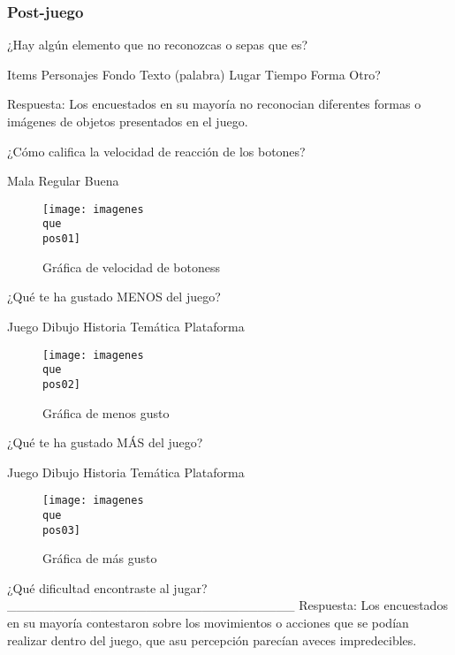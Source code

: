 \subsubsection{Post-juego}
\begin{questions}
	
	{%
	\checkboxchar{$\Box$} %
	\question ¿Hay algún elemento que no reconozcas  o sepas que es?
	\begin{checkboxes}
		\choice Items
		\choice Personajes
		\choice Fondo
		\choice Texto (palabra)
		\choice Lugar
		\choice Tiempo
		\choice Forma
		\choice Otro?
	\end{checkboxes}
}%

Respuesta: Los encuestados en su mayoría no reconocian diferentes formas o imágenes de objetos presentados en el juego.	

	\question ¿Cómo califica la velocidad de reacción de los botones?
	\begin{checkboxes}
		\choice Mala
		\choice Regular
		\choice Buena
	\end{checkboxes}

\begin{figure}
	\centering
	\caption{Gráfica de velocidad de botoness}
	\label{fig:pos01}
	\texttt{[image: imagenes\\que\\pos01]}
\end{figure}

	\question ¿Qué te ha gustado MENOS del juego?
	\begin{checkboxes}
		\choice Juego
		\choice Dibujo
		\choice Historia
		\choice Temática
		\choice Plataforma
	\end{checkboxes}

\begin{figure}
	\centering
	\caption{Gráfica de menos gusto}
	\label{fig:pos02}
	\texttt{[image: imagenes\\que\\pos02]}
\end{figure}

	
	\question ¿Qué te ha gustado MÁS del juego?
\begin{checkboxes}
	\choice Juego
	\choice Dibujo
	\choice Historia
	\choice Temática
	\choice Plataforma
\end{checkboxes}

\begin{figure}
	\centering
	\caption{Gráfica de más gusto}
	\label{fig:pos03}
	\texttt{[image: imagenes\\que\\pos03]}
\end{figure}


	\question ¿Qué dificultad encontraste al jugar?
	_______________________________
	Respuesta: Los encuestados en su mayoría contestaron sobre los movimientos o acciones que se podían realizar dentro del juego, que asu percepción parecían aveces impredecibles.


\end{questions}
